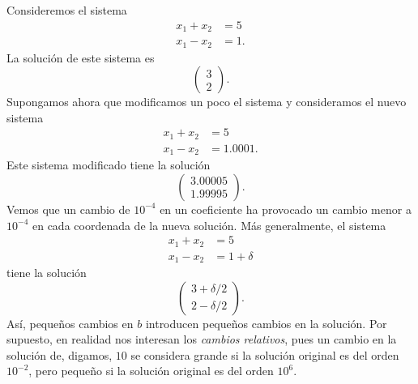 \begin{ejemplo}
    Consideremos el sistema
    \begin{align*}
        x_1+x_2&=5\\
        x_1-x_2&=1.
    \end{align*}
    La solución de este sistema es
    \begin{equation*}
        \begin{pmatrix}3\\2\end{pmatrix}.
    \end{equation*}
    Supongamos ahora que modificamos un poco el sistema y consideramos el nuevo sistema
    \begin{align*}
        x_1+x_2&=5\\
        x_1-x_2&=1.0001.
    \end{align*}
    Este sistema modificado tiene la solución
    \begin{equation*}
        \begin{pmatrix}3.00005\\1.99995\end{pmatrix}.
    \end{equation*}
    Vemos que un cambio de $10^{-4}$ en un coeficiente ha provocado un cambio menor a $10^{-4}$ en cada coordenada de la nueva solución. Más generalmente, el sistema
    \begin{align*}
        x_1+x_2&=5\\
        x_1-x_2&=1+\delta
    \end{align*}
    tiene la solución
    \begin{equation*}
        \begin{pmatrix}3+\delta/2\\2-\delta/2\end{pmatrix}.
    \end{equation*}
    Así, pequeños cambios en $b$ introducen pequeños cambios en la solución. Por supuesto, en realidad nos interesan los \textit{cambios relativos}, pues un cambio en la solución de, digamos, $10$ se considera grande si la solución original es del orden $10^{-2}$, pero pequeño si la solución original es del orden $10^{6}$.


\end{ejemplo}
